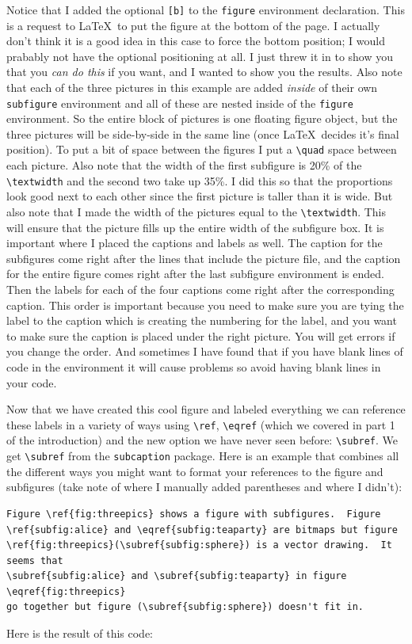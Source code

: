\documentclass{article}
\newcommand{\nid}{\noindent} %
\begin{document}
Notice that I added the optional \verb|[b]| to the \texttt{figure} environment declaration.  This is a request to \LaTeX\ to put the figure at the bottom of the page. I actually don't think it is a good idea in this case to force the bottom position;  I would prabably not have the optional positioning at all.  I just threw it in to show you that you \emph{can do this} if you want, and I wanted to show you the results.  Also note that each of the three pictures in this example are added \textit{inside} of their own \texttt{subfigure} environment and all of these are nested inside of the \texttt{figure} environment.  So the entire block of pictures is one floating figure object, but the three pictures will be side-by-side in the same line (once \LaTeX\ decides it's final position).  To put a bit of space between the figures I put a \verb|\quad| space between each picture.  Also note that the width of the first subfigure is 20\% of the \verb|\textwidth| and the second two take up 35\%.  I did this so that the proportions look good next to each other since the first picture is taller than it is wide.  But also note that I made the width of the pictures equal to the \verb|\textwidth|.  This will ensure that the picture fills up the entire width of the subfigure box.  It is important where I placed the captions and labels as well.  The caption for the subfigures come right after the lines that include the picture file, and the caption for the entire figure comes right after the last subfigure environment is ended.  Then the labels for each of the four captions come right after the corresponding caption.  This order is important because you need to make sure you are tying the label to the caption which is creating the numbering for the label, and you want to make sure the caption is placed under the right picture.  You will get errors if you change the order.  And sometimes I have found that if you have blank lines of code in the environment it will cause problems so avoid having blank lines in your code. 

Now that we have created this cool figure and labeled everything we can reference these labels in a variety of ways using \verb|\ref|, \verb|\eqref| (which we covered in part 1 of the introduction) and the new option we have never seen before: \verb|\subref|.  We get \verb|\subref| from the \verb|subcaption| package.  Here is an example that combines all the different ways you might want to format your references to the figure and subfigures (take note of where I manually added parentheses and where I didn't):
\begin{verbatim}
Figure \ref{fig:threepics} shows a figure with subfigures.  Figure 
\ref{subfig:alice} and \eqref{subfig:teaparty} are bitmaps but figure 
\ref{fig:threepics}(\subref{subfig:sphere}) is a vector drawing.  It seems that 
\subref{subfig:alice} and \subref{subfig:teaparty} in figure \eqref{fig:threepics} 
go together but figure (\subref{subfig:sphere}) doesn't fit in.
\end{verbatim}
\nid Here is the result of this code:\\
\end{document}
